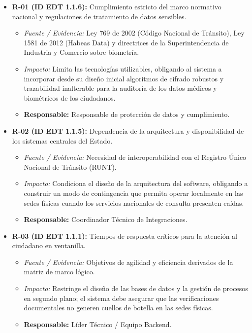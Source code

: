 \begin{itemize}
    \item \textbf{R-01 (ID EDT 1.1.6):} Cumplimiento estricto del marco normativo nacional y regulaciones de tratamiento de datos sensibles.
    \begin{itemize}
        \item \textit{Fuente / Evidencia:} Ley 769 de 2002 (Código Nacional de Tránsito), Ley 1581 de 2012 (Habeas Data) y directrices de la Superintendencia de Industria y Comercio sobre biometría.
        \item \textit{Impacto:} Limita las tecnologías utilizables, obligando al sistema a incorporar desde su diseño inicial algoritmos de cifrado robustos y trazabilidad inalterable para la auditoría de los datos médicos y biométricos de los ciudadanos.
        \item \textbf{Responsable:} Responsable de protección de datos y cumplimiento.
    \end{itemize}

    \item \textbf{R-02 (ID EDT 1.1.5):} Dependencia de la arquitectura y disponibilidad de los sistemas centrales del Estado.
    \begin{itemize}
        \item \textit{Fuente / Evidencia:} Necesidad de interoperabilidad con el Registro Único Nacional de Tránsito (RUNT).
        \item \textit{Impacto:} Condiciona el diseño de la arquitectura del software, obligando a construir un modo de contingencia que permita operar localmente en las sedes físicas cuando los servicios nacionales de consulta presenten caídas.
        \item \textbf{Responsable:} Coordinador Técnico de Integraciones.
    \end{itemize}

    \item \textbf{R-03 (ID EDT 1.1.1):} Tiempos de respuesta críticos para la atención al ciudadano en ventanilla.
    \begin{itemize}
        \item \textit{Fuente / Evidencia:} Objetivos de agilidad y eficiencia derivados de la matriz de marco lógico.
        \item \textit{Impacto:} Restringe el diseño de las bases de datos y la gestión de procesos en segundo plano; el sistema debe asegurar que las verificaciones documentales no generen cuellos de botella en las sedes físicas.
        \item \textbf{Responsable:} Líder Técnico / Equipo Backend.
    \end{itemize}
\end{itemize}

